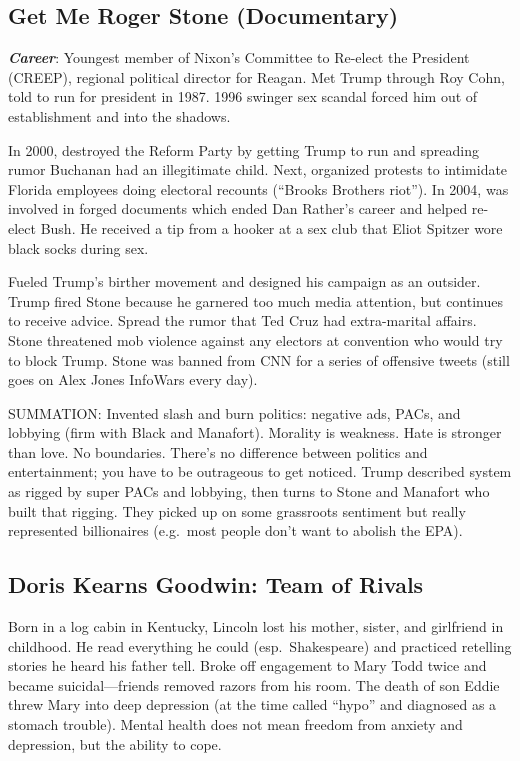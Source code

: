 \documentclass[
]{article}
\begin{document}
\hypertarget{get-me-roger-stone-documentary}{%
\subsection{Get Me Roger Stone
(Documentary)}\label{get-me-roger-stone-documentary}}

\textbf{\emph{Career}}: Youngest member of Nixon's Committee to Re-elect
the President (CREEP), regional political director for Reagan. Met Trump
through Roy Cohn, told to run for president in 1987. 1996 swinger sex
scandal forced him out of establishment and into the shadows.

In 2000, destroyed the Reform Party by getting Trump to run and
spreading rumor Buchanan had an illegitimate child. Next, organized
protests to intimidate Florida employees doing electoral recounts
(``Brooks Brothers riot''). In 2004, was involved in forged documents
which ended Dan Rather's career and helped re-elect Bush. He received a
tip from a hooker at a sex club that Eliot Spitzer wore black socks
during sex.

Fueled Trump's birther movement and designed his campaign as an
outsider. Trump fired Stone because he garnered too much media
attention, but continues to receive advice. Spread the rumor that Ted
Cruz had extra-marital affairs. Stone threatened mob violence against
any electors at convention who would try to block Trump. Stone was
banned from CNN for a series of offensive tweets (still goes on Alex
Jones InfoWars every day).

SUMMATION: Invented slash and burn politics: negative ads, PACs, and
lobbying (firm with Black and Manafort). Morality is weakness. Hate is
stronger than love. No boundaries. There's no difference between
politics and entertainment; you have to be outrageous to get noticed.
Trump described system as rigged by super PACs and lobbying, then turns
to Stone and Manafort who built that rigging. They picked up on some
grassroots sentiment but really represented billionaires (e.g.~most
people don't want to abolish the EPA).

\hypertarget{doris-kearns-goodwin-team-of-rivals}{%
\subsection{Doris Kearns Goodwin: Team of
Rivals}\label{doris-kearns-goodwin-team-of-rivals}}

Born in a log cabin in Kentucky, Lincoln lost his mother, sister, and
girlfriend in childhood. He read everything he could (esp.~Shakespeare)
and practiced retelling stories he heard his father tell. Broke off
engagement to Mary Todd twice and became suicidal---friends removed
razors from his room. The death of son Eddie threw Mary into deep
depression (at the time called ``hypo'' and diagnosed as a stomach
trouble). Mental health does not mean freedom from anxiety and
depression, but the ability to cope.
\end{document}
